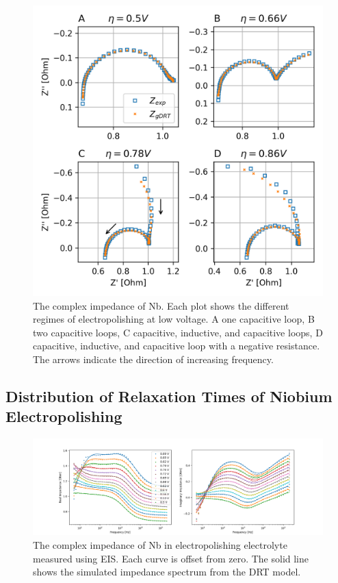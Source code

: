 \begin{figure}
  
  \includegraphics[width=\textwidth]{./figures/nyquist.png}
  \caption{The complex impedance of Nb. Each plot shows the different regimes of electropolishing at low voltage. A one capacitive loop, B two capacitive loops, C capacitive, inductive, and capacitive loops, D capacitive, inductive, and capacitive loop with a negative resistance. The arrows indicate the direction of increasing frequency.}
  \label{fig:nyquistplot}
\end{figure}










\subsection{Distribution of Relaxation Times of Niobium Electropolishing}



\begin{figure}
  
  \includegraphics[width=\textwidth]{./figures/bodeplot.png}
  \caption{The complex impedance of Nb in electropolishing electrolyte measured using EIS. Each curve is offset from zero. The solid line shows the simulated impedance spectrum from the DRT model.}
  \label{fig:bodeplot}
\end{figure}

